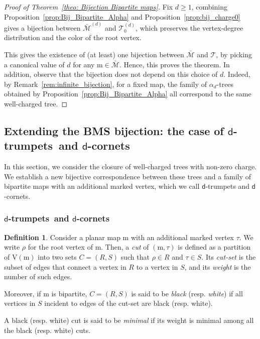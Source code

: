 \documentclass[11pt,reqno,tbtags]{amsart}
\renewcommand{\rm}{\mathrm{m}}
\numberwithin{equation}{section}
\numberwithin{theo}{section}
\theoremstyle{definition}
\newtheorem{defi}[theo]{Definition}
\newcommand{\dtrum}{$\mathsf{d}$-trumpet}
\newcommand{\dcorn}{$\mathsf{d}$-cornet}
\begin{document}
\begin{proof}[Proof of Theorem~\ref{theo: Bijection Bipartite maps}]
Fix $d\geq 1$, combining Proposition~\ref{prop:Bij_Bipartite_Alpha} and Proposition~\ref{prop:bij_charge0} gives a bijection between $\bar{\mathcal{M}}^{(d)}$ and $\mathcal{T}_0^{(d)}$, which preserves the vertex-degree distribution and the color of the root vertex.

This gives the existence of (at least) one bijection between $\bar{\mathcal{M}}$ and $\mathcal{T}$, by picking a canonical value of $d$ for any $\rm \in \bar{\mathcal{M}}$. Hence, this proves the theorem. In addition, observe that the bijection does not depend on this choice of $d$. Indeed, by Remark~\ref{rem:infinite_bijection}, for a fixed map, the family of $\alpha_d$-trees obtained by Proposition~\ref{prop:Bij_Bipartite_Alpha} all correspond to the same well-charged tree.
\end{proof}
		

	\subsection{Extending the BMS bijection: the case of \dtrum s~and \dcorn s}
		In this section, we consider the closure of well-charged trees with non-zero charge. We establish a new bijective correspondence between these trees and a family of bipartite maps with an additional marked vertex, which we call \dtrum s and \dcorn s. 
		
		\subsubsection{\dtrum s~and \dcorn s}\label{sec: def cuts trumpets corners}
\begin{defi}\label{def: cuts}
Consider a planar map $\rm$ with an additional marked vertex $\tau$. We write $\rho$ for the root vertex of $\rm$. Then, a \emph{cut} of $(\rm,\tau)$ is defined as a partition of $\mathrm{V}(\rm)$ into two sets $C=(R,S)$ such that $\rho\in R$ and $\tau\in S$. 
Its \emph{cut-set} is the subset of edges that connect a vertex in $R$ to a vertex in $S$, and its \emph{weight} is the number of such edges. 

Moreover, if $\rm$ is bipartite, $C=(R,S)$ is said to be \emph{black} (resp. \emph{white}) if all vertices in $S$ incident to edges of the cut-set are black (resp. white).

A black (resp. white) cut is said to be \emph{minimal} if its weight is minimal among all the black (resp. white) cuts. 
\end{defi}
\end{document}

